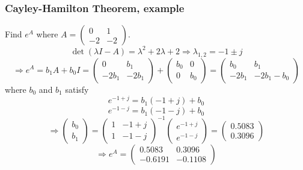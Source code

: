 \documentclass{beamer}
\begin{document}
\begin{frame}\frametitle{Cayley-Hamilton Theorem, example}
	Find $e^A$ where 
	$A = \begin{pmatrix}
	    	0 & 1\\
	    	-2 & -2
	  	  \end{pmatrix}$.  
	{\footnotesize
	\[ \det(\lambda I - A ) = \lambda^2 + 2\lambda + 2 \Rightarrow
	\lambda_{1,2} = -1 \pm j \]
	\[ \Rightarrow e^A = b_1A + b_0I = \begin{pmatrix}
	    0 & b_1\\
	    -2b_1 & -2b_1
	  \end{pmatrix}+\begin{pmatrix}
	    b_0 & 0\\
	    0 & b_0
	  \end{pmatrix} = \begin{pmatrix}
	    b_0 & b_1\\
	    -2b_1 & -2b_1-b_0
	  \end{pmatrix}\]
	}
	where $b_0$ and $b_1$ satisfy
	\[e^{-1+j} = b_1(-1+j) + b_0\]
	\[e^{-1-j} = b_1(-1-j)+b_0 \]
	\[ \Rightarrow \begin{pmatrix}
	    b_0\\b_1
	  \end{pmatrix}
	= \begin{pmatrix}
	    1 & -1+j\\
	    1 & -1-j
	  \end{pmatrix}^{-1}\begin{pmatrix}
	    e^{-1+j}\\e^{-1-j}
	  \end{pmatrix}=\begin{pmatrix}
	    0.5083\\
	    0.3096
	  \end{pmatrix}
	\]
	\[\Rightarrow e^{A} = \begin{pmatrix}
	    0.5083 & 0.3096\\
	    -0.6191 & -0.1108
	  \end{pmatrix}
	 \]
\end{frame}
\end{document}
